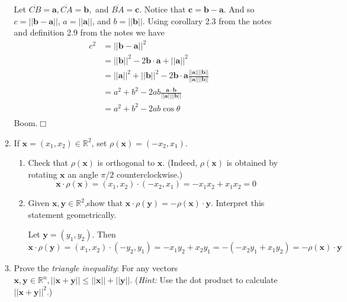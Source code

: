 \documentclass[letterpaper]{article}
\begin{document}
\begin{enumerate}
\begin{enumerate}
    Let $\overline{CB}=\mathbf{a}, \overline{CA}=\mathbf{b},$ and $\overline{BA}=\mathbf{c}$.
    Notice that $\mathbf{c}=\mathbf{b}-\mathbf{a}$.
    And so $c=||\mathbf{b}-\mathbf{a}||$, $a=||\mathbf{a}||$, and $b=||\mathbf{b}||$.
    Using corollary 2.3 from the notes and definition 2.9 from the notes we have
    \begin{align*}
      c^2&=||\mathbf{b}-\mathbf{a}||^2\\
      &=||\mathbf{b}||^2-2\mathbf{b}\cdot\mathbf{a}+||\mathbf{a}||^2\\
      &=||\mathbf{a}||^2+||\mathbf{b}||^2-2\mathbf{b}\cdot\mathbf{a}\frac{||\mathbf{a}||||\mathbf{b}||}{||\mathbf{a}||||\mathbf{b}||}\\
      &=a^2+b^2-2ab\frac{\mathbf{a}\cdot\mathbf{b}}{||\mathbf{a}||||\mathbf{b}||}\\
      &=a^2+b^2-2ab\cos \theta\\
    \end{align*}
    Boom.$\Box$
  \setcounter{enumii}{16}
  \item
    If $\mathbf{x}=(x_1,x_2)\in \mathbb{R}^2$, set $\rho(\mathbf{x})=(-x_2,x_1)$.
    \begin{enumerate}
    \item
      Check that $\rho(\mathbf{x})$ is orthogonal to $\mathbf{x}$. (Indeed, $\rho(\mathbf{x})$ is obtained by rotating $\mathbf{x}$ an angle $\pi/2$ counterclockwise.)
      \[\mathbf{x}\cdot\rho(\mathbf{x})=(x_1,x_2)\cdot(-x_2,x_1)=-x_1x_2+x_1x_2=0\]
    \item
      Given $\mathbf{x},\mathbf{y}\in\mathbb{R}^2$,show that $\mathbf{x}\cdot\rho(\mathbf{y})=-\rho(\mathbf{x})\cdot\mathbf{y}$. Interpret this statement geometrically.

      Let $\mathbf{y}=(y_1,y_2)$. Then \[\mathbf{x}\cdot\rho(\mathbf{y})=(x_1,x_2)\cdot(-y_2,y_1)=-x_1y_2+x_2y_1=-(-x_2y_1+x_1y_2)=-\rho(\mathbf{x})\cdot\mathbf{y}\]
    \end{enumerate}
  \item
    Prove the \emph{triangle inequality}: For any vectors $\mathbf{x}, \mathbf{y}\in \mathbb{R}^n, ||\mathbf{x}+\mathbf{y}||\le ||\mathbf{x}||+||\mathbf{y}||$. (\emph{Hint:} Use the dot product to calculate $||\mathbf{x}+\mathbf{y}||^2$.)


\end{enumerate}
\end{enumerate}
\end{document}
